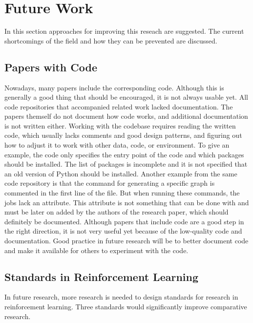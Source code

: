 \chapter{Future Work}\label{sec:future-work}

In this section approaches for improving this reseach are suggested. The
current shortcomings of the field and how they can be prevented are discussed.


\section{Papers with Code}

Nowadays, many papers include the corresponding
code. Although this is generally a good thing
that should be encouraged, it is not always usable yet. All code repositories
that accompanied related work lacked documentation. The papers themself do not
document how code works, and additional documentation is not written either.
Working with the codebase requires reading the written code, which usually
lacks comments and good design patterns, and figuring out how to adjust it to
work with other data, code, or environment. To give an example, the \mrlco
code only specifies the entry
point of the code and which packages should be installed. The list of packages
is incomplete and it is not specified that an old version of Python should be
installed. Another example from the same code repository is that the command
for generating a specific graph is commented in the first line of the file.
But when running these commands, the jobs lack an 
attribute. This attribute is not something that can be done with 
and must be later on added by the authors of the research paper, which should
definitely be documented. Although papers that include code are a good step in
the right direction, it is not very useful yet because of the low-quality code
and documentation. Good practice in future research will be to better document
code and make it available for others to experiment with the code.


\section{Standards in Reinforcement Learning}\label{sec:standards}

In future research, more research is needed to design standards for research
in reinforcement learning. Three standards would significantly improve comparative
research.

